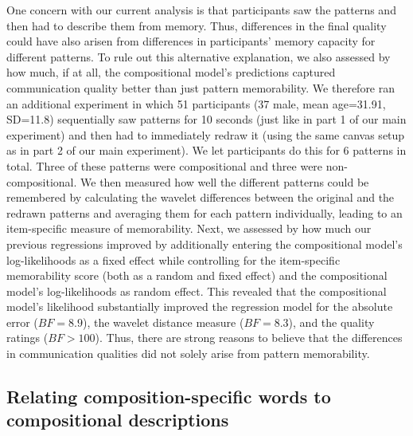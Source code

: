 \documentclass[a4paper,man, floatsintext, natbib]{apa6}
\begin{document}
One concern with our current analysis is that participants saw the patterns and then had to describe them from memory. Thus, differences in the final quality could have also arisen from differences in participants' memory capacity for different patterns. To rule out this alternative explanation, we also assessed by how much, if at all, the compositional model's predictions captured communication quality better than just pattern memorability. We therefore ran an additional experiment in which 51 participants (37 male, mean age=31.91, SD=11.8) sequentially saw patterns for 10 seconds (just like in part 1 of our main experiment) and then had to immediately redraw it (using the same canvas setup as in part 2 of our main experiment). We let participants do this for 6 patterns in total. Three of these patterns were compositional and three were non-compositional. We then measured how well the different patterns could be remembered by calculating the wavelet differences between the original and the redrawn patterns and averaging them for each pattern individually, leading to an item-specific measure of memorability. Next, we assessed by how much our previous regressions improved by additionally entering the compositional model's log-likelihoods as a fixed effect while controlling for the item-specific memorability score (both as a random and fixed effect) and the compositional model's log-likelihoods as random effect. This revealed that the compositional model's likelihood substantially improved the regression model for the absolute error ($BF=8.9$), the wavelet distance measure ($BF=8.3$), and the quality ratings ($BF>100$). Thus, there are strong reasons to believe that the differences in communication qualities did not solely arise from pattern memorability.

\subsection{Relating composition-specific words to compositional descriptions}
\end{document}
